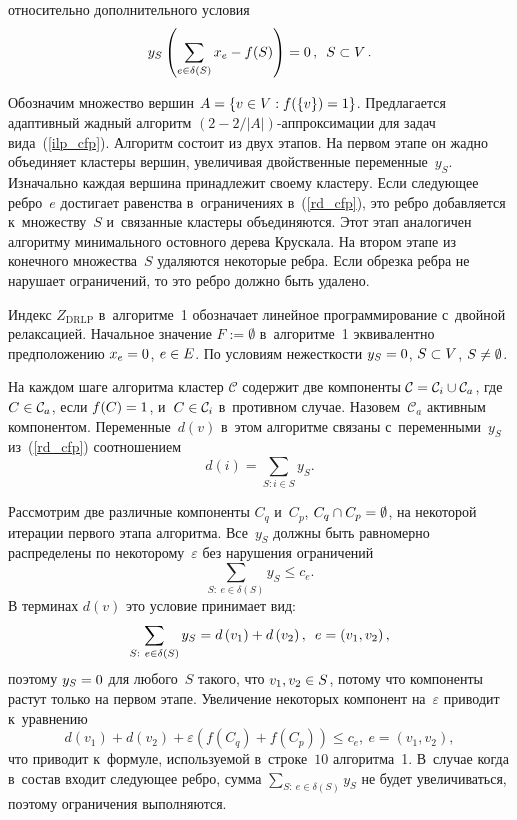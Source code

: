 \begin{multicols}{2}
\vspace*{-3pt}

\noindent
относительно дополнительного условия
$$
y_S \left(\sum\limits_{e\in \delta(S)}x_e - f(S)\right) = 0\,,\enskip S\subset  V\,.
$$

Обозначим множество вершин $A=\{v\hm\in V: f(\{v\})\hm=1\}$. Предлагается адаптивный 
жадный алгоритм $\left(2-{2}/{\vert A\vert }\right)$-ап\-прок\-си\-ма\-ции для задач 
вида~(\ref{ilp_cfp}). Алгоритм состоит из двух этапов. На первом этапе он жадно 
объединяет кластеры вершин, увеличивая двойственные переменные~$y_S$. Изначально 
каждая вершина принадлежит своему клас\-те\-ру. Если сле\-ду\-ющее реб\-ро~$e$ достигает 
равенства в~ограничениях в~(\ref{rd_cfp}), это ребро добавляется к~множеству~$S$ и~связанные клас\-те\-ры объединяются. Этот этап аналогичен алгоритму минимального 
остовного дерева Крускала. На втором этапе из конечного множества~$S$ удаляются 
некоторые ребра. Если обрезка ребра не нарушает ограничений, то это реб\-ро должно 
быть удалено.


Индекс $Z_{\mathrm{DRLP}}$ в~алгоритме~1 обозначает линейное 
программирование с~двойной релаксацией. Начальное значение $F:=\emptyset$ 
в~алгоритме~1 эквивалентно предположению $x_e \hm= 0$, $ e \hm\in E$. 
По условиям нежесткости $y_S \hm= 0$, $S \hm\subset V$,  $S \hm\not= \emptyset$.

На каждом шаге алгоритма кластер $\mathcal{C}$ содержит две компоненты 
$\mathcal{C} \hm= \mathcal{C}_i \hm\cup \mathcal{C}_a$, где $C\hm\in\mathcal{C }_a$, если 
$f(C) \hm= 1$, и~$C\hm\in\mathcal{C}_i$ в~противном случае. Назовем~$\mathcal{C}_a$ 
активным компонентом.
Переменные~$d(v)$ в~этом алгоритме связаны с~переменными~$y_S$ из~(\ref{rd_cfp}) 
соотношением
$$
d(i) = \sum\limits_{S:i\in S}y_S.
$$ 

Рассмотрим две различные компоненты $C_q$ и~$C_p$, $C_q\cap C_p\hm=\emptyset$, на 
некоторой итерации первого этапа алгоритма. Все~$y_S$ должны быть равномерно 
распределены по некоторому~$\varepsilon$ без нарушения ограничений
$$
\sum\limits_ {S:~e\in \delta(S)}y_S\leqslant c_e. 
$$
В терминах $d(v)$ это условие принимает вид:
$$
\sum\limits_{S:~e\in \delta(S)}y_S = d\left(v_1\right)+d\left(v_2\right),\enskip e=\left( v_1,v_2\right),
$$
поэтому $y_S\hm=0$ для любого~$S$ такого, что $v_1, v_2\hm\in S$, потому что 
компоненты растут только на первом этапе. Увеличение некоторых компонент на~$\varepsilon$ приводит к~уравнению
$$
d(v_1)+d(v_2)+\varepsilon \left(f(C_q)+f(C_p)\right)\leqslant 
c_e,\ e=\left(v_1,v_2\right), 
$$
что приводит к~формуле, используемой в~строке~$10$ алгоритма~1. 
В~случае когда в~состав входит следующее ребро, сумма $\sum\nolimits_{S:~e\in 
\delta (S)}y_S$ не будет увеличиваться, поэтому ограничения выполняются.


\end{multicols}
